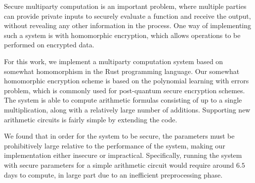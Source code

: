 \documentclass[../main.tex]{subfiles}
\begin{document}
Secure multiparty computation is an important problem, where multiple parties can provide private inputs to securely evaluate a function and receive the output, without revealing any other information in the process.
One way of implementing such a system is with homomorphic encryption, which allows operations to be performed on encrypted data.

For this work, we implement a multiparty computation system based on somewhat homomorphism in the Rust programming language.
Our somewhat homomorphic encryption scheme is based on the polynomial learning with errors problem,
which is commonly used for post-quantum secure encryption schemes. 
The system is able to compute arithmetic formulas consisting of up to a single multiplication, along with a relatively large number of additions.
Supporting new arithmetic circuits is fairly simple by extending the code.

We found that in order for the system to be secure, the parameters must be prohibitively large relative to the performance of the system, making our implementation either insecure or impractical.
Specifically, running the system with secure parameters for a simple arithmetic circuit would require around $6.5$ days to compute, in large part due to an inefficient preprocessing phase.
\end{document}
